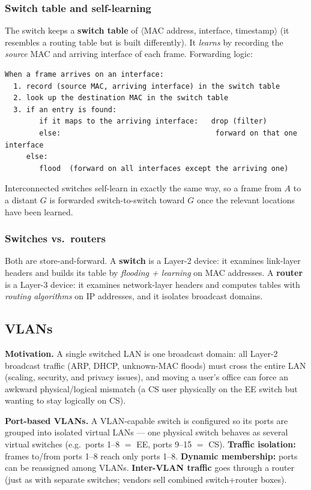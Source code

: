\documentclass[hidelinks]{article}
\begin{document}
\subsubsection{Switch table and self-learning}
The switch keeps a \textbf{switch table} of
$\langle$MAC address, interface, timestamp$\rangle$ (it resembles a routing
table but is built differently). It \emph{learns} by recording the
\emph{source} MAC and arriving interface of each frame. Forwarding logic:

\begin{lstlisting}[caption={Switch frame filtering / forwarding}]
When a frame arrives on an interface:
  1. record (source MAC, arriving interface) in the switch table
  2. look up the destination MAC in the switch table
  3. if an entry is found:
        if it maps to the arriving interface:   drop (filter)
        else:                                    forward on that one interface
     else:
        flood  (forward on all interfaces except the arriving one)
\end{lstlisting}
Interconnected switches self-learn in exactly the same way, so a frame from $A$
to a distant $G$ is forwarded switch-to-switch toward $G$ once the relevant
locations have been learned.

\subsubsection{Switches vs.\ routers}
Both are store-and-forward. A \textbf{switch} is a Layer-2 device: it examines
link-layer headers and builds its table by \emph{flooding + learning} on MAC
addresses. A \textbf{router} is a Layer-3 device: it examines network-layer
headers and computes tables with \emph{routing algorithms} on IP addresses,
and it isolates broadcast domains.

\subsection{VLANs}

\textbf{Motivation.} A single switched LAN is one broadcast domain: all Layer-2
broadcast traffic (ARP, DHCP, unknown-MAC floods) must cross the entire LAN
(scaling, security, and privacy issues), and moving a user's office can force
an awkward physical/logical mismatch (a CS user physically on the EE switch but
wanting to stay logically on CS).

\textbf{Port-based VLANs.} A VLAN-capable switch is configured so its ports are
grouped into isolated virtual LANs --- one physical switch behaves as several
virtual switches (e.g.\ ports 1--8 $=$ EE, ports 9--15 $=$ CS).
\textbf{Traffic isolation:} frames to/from ports 1--8 reach only ports 1--8.
\textbf{Dynamic membership:} ports can be reassigned among VLANs.
\textbf{Inter-VLAN traffic} goes through a router (just as with separate
switches; vendors sell combined switch+router boxes).
\end{document}
